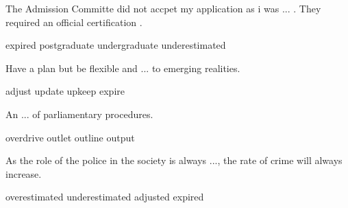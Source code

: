 \documentclass{exam}
\begin{document}
\begin{questions}
\question The Admission Committe did not accpet my application as i was ... . They required an official certification . \\
\begin{oneparchoices}
\choice expired
\choice postgraduate
\correctchoice undergraduate
\choice underestimated
\end{oneparchoices}
\question Have a plan but be flexible and ... to emerging realities.\\
\begin{oneparchoices}
\correctchoice adjust
\choice update
\choice upkeep
\choice expire
\end{oneparchoices}
\question An ... of parliamentary procedures.\\
\begin{oneparchoices}
\choice overdrive
\choice outlet
\correctchoice outline
\choice output
\end{oneparchoices}

\question As the role of the police in the society is always ..., the rate of crime will always increase.\\
\begin{oneparchoices}
\choice overestimated
 \correctchoice underestimated
 \choice adjusted
 \choice expired 
\end{oneparchoices}



\end{questions}
\end{document}
